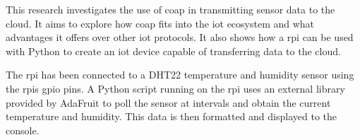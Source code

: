 This research investigates the use of \gls{coap} in transmitting sensor data
to the cloud. It aims to explore how \gls{coap} fits into the \gls{iot} ecosystem and
what advantages it offers over other \gls{iot} protocols. It also shows how a \gls{rpi} can
be used with Python to create an \gls{iot} device capable of transferring data to the cloud. 

The \gls{rpi} has been connected to a DHT22 temperature and humidity sensor using
the \glspl{rpi} \gls{gpio} pins. A Python script running on the \gls{rpi} uses
an external library provided by AdaFruit to poll the sensor at intervals and 
obtain the current temperature and humidity. This data is then formatted and
displayed to the console.